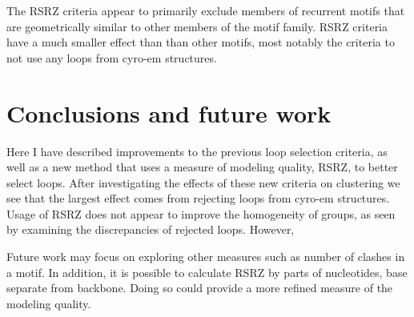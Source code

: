 The RSRZ criteria appear to primarily exclude members of recurrent motifs that
are geometrically similar to other members of the motif family. RSRZ criteria
have a much smaller effect than than other motifs, most notably the criteria to
not use any loops from cyro-em structures. 


\section{Conclusions and future work}

Here I have described improvements to the previous loop selection criteria, as
well as a new method that uses a measure of modeling quality, RSRZ, to better
select loops. After investigating the effects of these new criteria on
clustering we see that the largest effect comes from rejecting loops from
cyro-em structures. Usage of RSRZ does not appear to improve the homogeneity of
groups, as seen by examining the discrepancies of rejected loops. However, 

Future work may focus on exploring other measures such as number of clashes in a
motif. In addition, it is possible to calculate RSRZ by parts of nucleotides,
base separate from backbone. Doing so could provide a more refined measure of
the modeling quality.

